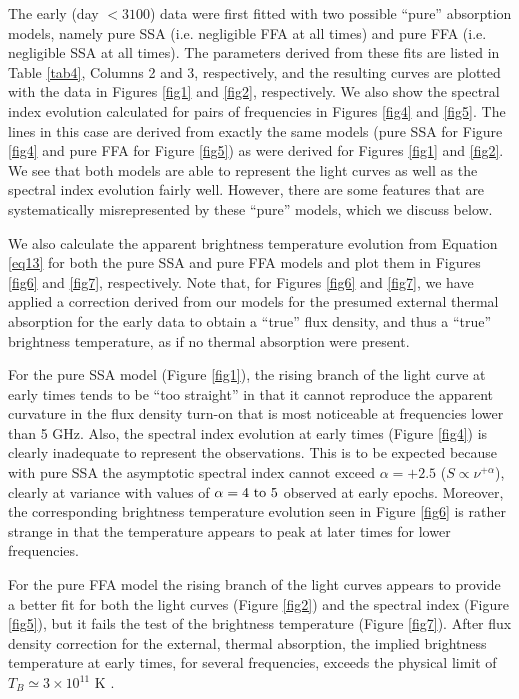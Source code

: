 \documentclass[12pt,preprint]{aastex}
\newcommand{\eg}{{\it e.g., }}
\begin{document}
The early (day $<3100$) data were first fitted with two possible ``pure'' absorption models, namely
pure SSA (i.e. negligible FFA at all times) and pure FFA
(i.e.  negligible SSA at all times).
The  parameters derived from these fits are listed in Table \ref{tab4}, Columns 2 and 3, respectively, 
and the resulting curves are plotted with the data in Figures \ref{fig1}
and \ref{fig2}, respectively.  We also show the spectral index evolution calculated for
pairs of frequencies in Figures \ref{fig4} and \ref{fig5}. The lines in this case are derived from exactly the same models (pure SSA for Figure \ref{fig4} and pure FFA for Figure \ref{fig5}) as were derived for Figures \ref{fig1} and \ref{fig2}. We see that both models are able to represent the light curves as well as the spectral index evolution fairly well. However, there are some features that are
systematically misrepresented by these ``pure'' models, which we discuss below. 

We also calculate the apparent brightness temperature evolution from Equation \ref{eq13} for both the pure SSA and pure FFA models and plot them in Figures \ref{fig6} and \ref{fig7}, respectively. Note that, for Figures \ref{fig6} and \ref{fig7}, we have applied a correction derived from our models for the presumed external thermal absorption for the early data to obtain a ``true'' flux density, and thus a ``true'' brightness temperature, as if no thermal absorption were present.

For the pure SSA model (Figure \ref{fig1}), the rising branch of the light curve at early times 
tends to be ``too straight'' in that it cannot reproduce the apparent curvature in the flux density turn-on that is most noticeable at frequencies lower than 5 GHz.  Also, the spectral index evolution at early times (Figure \ref{fig4}) is clearly inadequate to represent the observations. This is to be expected because with pure SSA the asymptotic spectral index cannot exceed $\alpha = +2.5$ ($S \propto \nu^{+\alpha}$), clearly at variance with values of $\alpha = 4~{\rm to}~5$ observed at early epochs. Moreover, the corresponding brightness temperature evolution seen in Figure \ref{fig6} is rather strange in that the temperature appears to peak at later times for lower frequencies. 

For the pure FFA model the rising branch of the light curves appears to provide a better fit for both the light curves (Figure \ref{fig2}) and the spectral index (Figure \ref{fig5}), but it fails the test of the brightness temperature (Figure \ref{fig7}). After flux density correction for the external, thermal absorption, the implied brightness temperature at early times, for several frequencies, exceeds the physical limit of $T_B \simeq 3\times 10^{11}$ K \citep[see, \eg][]{Kellermann69,Readhead94}.
\end{document}
